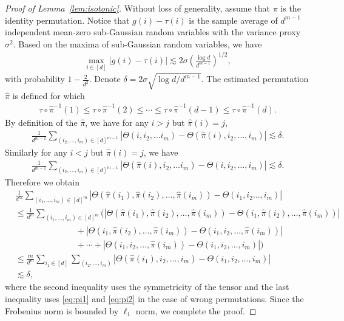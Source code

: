 \documentclass[12pt]{article}
\theoremstyle{definition}
\begin{document}
\begin{proof}[Proof of Lemma~\ref{lem:isotonic}]
Without loss of generality, assume that $\pi$ is the identity permutation. Notice that $g(i)-\tau(i)$ is the sample average of $d^{m-1}$ independent mean-zero sub-Gaussian random variables with the variance proxy $\sigma^2$. Based on the maxima of sub-Gaussian random variables, we have 
\begin{align}
     \max_{i\in[d]}|g(i)-\tau(i)| \lesssim 2\sigma\left( \frac{\log d}{d^{m-1}}\right)^{1/2},
\end{align}
with probability $1-\frac{2}{d^2}$. Denote $\delta=2\sigma\sqrt{\log d / d^{m-1}}$. 
The estimated permutation $\hat\pi$ is defined for which 
\begin{align}\label{eq:mon3}
    \tau \circ \hat\pi^{-1}(1) \leq\tau \circ \hat\pi^{-1}(2) \leq \cdots\leq \tau \circ \hat\pi^{-1}(d-1) \leq \tau \circ \hat\pi^{-1}(d).
\end{align}
By definition of the $\hat\pi$, we have for any $i>j$ but $\hat\pi(i)= j$, 
\begin{align}\label{eq:pi1}
    \frac{1}{d^{m-1}}\sum_{(i_2,\ldots,i_m)\in[d]^{m-1}}\left|\Theta(i,i_2,\ldots i_m)-\Theta(\hat\pi(i),i_2,\ldots,i_m)\right|\lesssim \delta.
\end{align}
Similarly for any $i<j$ but $\hat\pi(i) = j$, we have
\begin{align}\label{eq:pi2}
    \frac{1}{d^{m-1}}\sum_{(i_2,\ldots,i_m)\in[d]^{m-1}}\left|\Theta(\hat\pi(i),i_2,\ldots i_m)-\Theta(i,i_2,\ldots,i_m)\right|\lesssim \delta.
\end{align}
Therefore we obtain
\begin{align}
    &\frac{1}{d^m}\sum_{(i_1,\ldots,i_m)\in[d]^m}|\Theta(\hat\pi(i_1),\hat\pi(i_2),\ldots,\hat\pi(i_m))-\Theta(i_1,i_2\ldots,i_m)|\\&\leq \frac{1}{d^m}\sum_{(i_1,\ldots,i_m)\in[d]^m}\bigg(|\Theta(\hat\pi(i_1),\hat\pi(i_2),\ldots,\hat\pi(i_m))-\Theta(i_1,\hat\pi(i_2),\ldots,\hat\pi(i_m))|\\&\hspace{3cm}+|\Theta(i_1,\hat\pi(i_2),\ldots,\hat\pi(i_m))-\Theta(i_1,i_2,\ldots,\hat\pi(i_m))|\\&\hspace{3cm}+\cdots+|\Theta(i_1,i_2,\ldots,\hat\pi(i_m))-\Theta(i_1,i_2,\ldots,i_m)|\bigg)\\&\leq\frac{m}{d^m}\sum_{i_1\in[d]}\sum_{(i_2,\ldots,i_m)}|\Theta(\hat\pi(i_1),i_2,\ldots,i_m)-\Theta(i_1,i_2,\ldots,i_m)|\\&\lesssim \delta,
\end{align}
where the second inequality uses the symmetricity of the tensor and the last inequality uses \eqref{eq:pi1} and \eqref{eq:pi2} in the case of wrong permutations. Since the Frobenius norm is bounded by $\ell_1$ norm, we complete the proof.
\end{proof}
\end{document}
